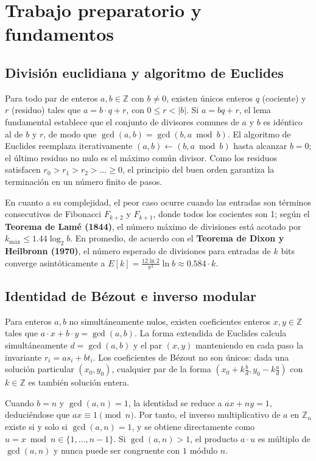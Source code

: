 \section{Trabajo preparatorio y fundamentos}

\subsection{División euclidiana y algoritmo de Euclides}
Para todo par de enteros $a, b \in \mathbb{Z}$ con $b \neq 0$, existen únicos enteros $q$ (cociente) y $r$ (residuo) tales que $a = b \cdot q + r$, con $0 \le r < |b|$. Si $a = bq + r$, el lema fundamental establece que el conjunto de divisores comunes de $a$ y $b$ es idéntico al de $b$ y $r$, de modo que $\gcd(a, b) = \gcd(b, a \bmod b)$. El algoritmo de Euclides reemplaza iterativamente $(a, b) \leftarrow (b, a \bmod b)$ hasta alcanzar $b = 0$; el último residuo no nulo es el máximo común divisor. Como los residuos satisfacen $r_0 > r_1 > r_2 > \dots \ge 0$, el principio del buen orden garantiza la terminación en un número finito de pasos.

En cuanto a su complejidad, el peor caso ocurre cuando las entradas son términos consecutivos de Fibonacci $F_{k+2}$ y $F_{k+1}$, donde todos los cocientes son 1; según el \textbf{Teorema de Lamé (1844)}, el número máximo de divisiones está acotado por $k_{\text{máx}} \le 1.44 \log_2 b$. En promedio, de acuerdo con el \textbf{Teorema de Dixon y Heilbronn (1970)}, el número esperado de divisiones para entradas de $k$ bits converge asintóticamente a $E[k] = \frac{12 \ln 2}{\pi^2} \ln b \approx 0.584 \cdot k$.

\subsection{Identidad de Bézout e inverso modular}
Para enteros $a, b$ no simultáneamente nulos, existen coeficientes enteros $x, y \in \mathbb{Z}$ tales que $a \cdot x + b \cdot y = \gcd(a, b)$. La forma extendida de Euclides calcula simultáneamente $d = \gcd(a, b)$ y el par $(x, y)$ manteniendo en cada paso la invariante $r_i = a s_i + b t_i$. Los coeficientes de Bézout no son únicos: dada una solución particular $(x_0, y_0)$, cualquier par de la forma $(x_0 + k \frac{b}{d}, y_0 - k \frac{a}{d})$ con $k \in \mathbb{Z}$ es también solución entera.

Cuando $b = n$ y $\gcd(a, n) = 1$, la identidad se reduce a $ax + ny = 1$, deduciéndose que $ax \equiv 1 \pmod n$. Por tanto, el inverso multiplicativo de $a$ en $\mathbb{Z}_n$ existe si y solo si $\gcd(a, n) = 1$, y se obtiene directamente como $u = x \bmod n \in \{1, \dots, n-1\}$. Si $\gcd(a, n) > 1$, el producto $a \cdot u$ es múltiplo de $\gcd(a, n)$ y nunca puede ser congruente con $1$ módulo $n$.

